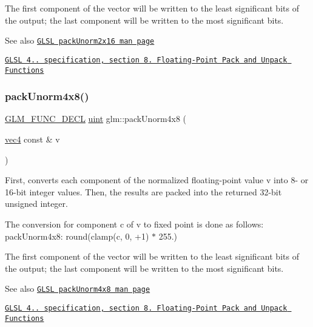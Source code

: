The first component of the vector will be written to the least significant bits of the output; the last component will be written to the most significant bits.

\begin{DoxySeeAlso}{See also}
\href{http://www.opengl.org/sdk/docs/manglsl/xhtml/packUnorm2x16.xml}{\tt G\+L\+SL pack\+Unorm2x16 man page} 

\href{http://www.opengl.org/registry/doc/GLSLangSpec.4.20.8.pdf}{\tt G\+L\+SL 4.. specification, section 8. Floating-\/\+Point Pack and Unpack Functions} 
\end{DoxySeeAlso}
\mbox{\label{group__core__func__packing_gaf7d2f7341a9eeb4a436929d6f9ad08f2}} 
\subsubsection{\texorpdfstring{pack\+Unorm4x8()}{packUnorm4x8()}}
{\footnotesize\ttfamily \hyperlink{setup_8hpp_ab2d052de21a70539923e9bcbf6e83a51}{G\+L\+M\+\_\+\+F\+U\+N\+C\+\_\+\+D\+E\+CL} \hyperlink{group__core__precision_ga4fd29415871152bfb5abd588334147c8}{uint} glm\+::pack\+Unorm4x8 (\begin{DoxyParamCaption}\item[{\hyperlink{group__core__types_ga5881b1b022d7fd1b7218f5916532dd02}{vec4} const \&}]{v }\end{DoxyParamCaption})}

First, converts each component of the normalized floating-\/point value v into 8-\/ or 16-\/bit integer values. Then, the results are packed into the returned 32-\/bit unsigned integer.

The conversion for component c of v to fixed point is done as follows\+: pack\+Unorm4x8\+: round(clamp(c, 0, +1) $\ast$ 255.)

The first component of the vector will be written to the least significant bits of the output; the last component will be written to the most significant bits.

\begin{DoxySeeAlso}{See also}
\href{http://www.opengl.org/sdk/docs/manglsl/xhtml/packUnorm4x8.xml}{\tt G\+L\+SL pack\+Unorm4x8 man page} 

\href{http://www.opengl.org/registry/doc/GLSLangSpec.4.20.8.pdf}{\tt G\+L\+SL 4.. specification, section 8. Floating-\/\+Point Pack and Unpack Functions} 
\end{DoxySeeAlso}
\mbox{\label{group__core__func__packing_ga5f4296dc5f12f0aa67ac05b8bb322483}} 
